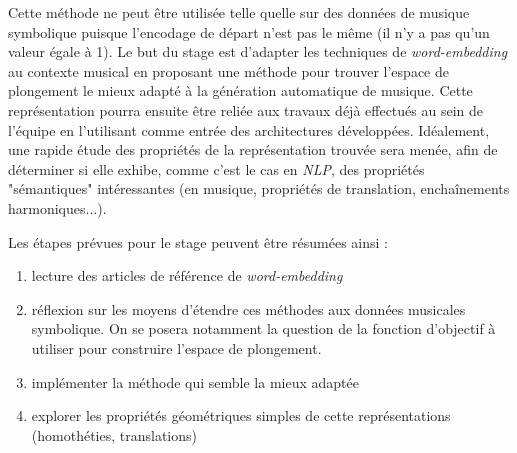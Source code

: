 \documentclass[a4paper, 10pt]{article} %
\begin{document}
Cette méthode ne peut être utilisée telle quelle sur des données de musique symbolique puisque l'encodage de départ n'est pas le même (il n'y a pas qu'un valeur égale à 1). Le but du stage est d'adapter les techniques de \textit{word-embedding} au contexte musical en proposant une méthode pour trouver l'espace de plongement le mieux adapté à la génération automatique de musique. Cette représentation pourra ensuite être reliée aux travaux déjà effectués au sein de l'équipe en l'utilisant comme entrée des architectures développées. Idéalement, une rapide étude des propriétés de la représentation trouvée sera menée, afin de déterminer si elle exhibe, comme c'est le cas en \textit{NLP}, des propriétés "sémantiques" intéressantes (en musique, propriétés de translation, enchaînements harmoniques...).

Les étapes prévues pour le stage peuvent être résumées ainsi :
\begin{enumerate}
\item lecture des articles de référence de \textit{word-embedding}
\item réflexion sur les moyens d'étendre ces méthodes aux données musicales symbolique. On se posera notamment la question de la fonction d'objectif à utiliser pour construire l'espace de plongement.
\item implémenter la méthode qui semble la mieux adaptée
\item explorer les propriétés géométriques simples de cette représentations (homothéties, translations)
\end{enumerate}





\end{document}
